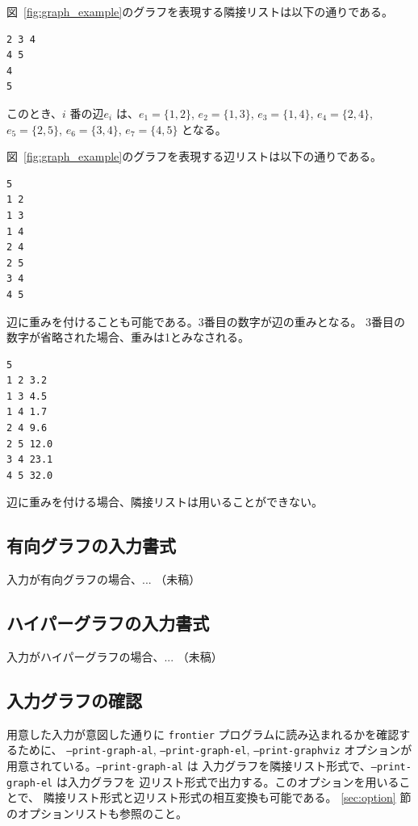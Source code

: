 \documentclass{jsarticle}
\begin{document}
図~\ref{fig:graph_example}のグラフを表現する隣接リストは以下の通りである。

\begin{verbatim}
2 3 4
4 5
4
5

\end{verbatim}

このとき、$i$ 番の辺$e_i$ は、$e_1 = \{1, 2\}$, $e_2 = \{1, 3\}$, $e_3 = \{1, 4\}$,
$e_4 = \{2, 4\}$, $e_5 = \{2, 5\}$, $e_6 = \{3, 4\}$, $e_7 = \{4, 5\}$ となる。

図~\ref{fig:graph_example}のグラフを表現する辺リストは以下の通りである。

\begin{verbatim}
5
1 2
1 3
1 4
2 4
2 5
3 4
4 5
\end{verbatim}

辺に重みを付けることも可能である。3番目の数字が辺の重みとなる。
3番目の数字が省略された場合、重みは1とみなされる。

\begin{verbatim}
5
1 2 3.2
1 3 4.5
1 4 1.7
2 4 9.6
2 5 12.0
3 4 23.1
4 5 32.0
\end{verbatim}

辺に重みを付ける場合、隣接リストは用いることができない。

\subsection{有向グラフの入力書式}

入力が有向グラフの場合、... （未稿）

\subsection{ハイパーグラフの入力書式}

入力がハイパーグラフの場合、... （未稿）

\subsection{入力グラフの確認}

用意した入力が意図した通りに \texttt{frontier} プログラムに読み込まれるかを確認するために、
\texttt{--print-graph-al}, \texttt{--print-graph-el},
\texttt{--print-graphviz} オプションが用意されている。\texttt{--print-graph-al} は
入力グラフを隣接リスト形式で、\texttt{--print-graph-el} は入力グラフを
辺リスト形式で出力する。このオプションを用いることで、
隣接リスト形式と辺リスト形式の相互変換も可能である。
\ref{sec:option} 節のオプションリストも参照のこと。
\end{document}
